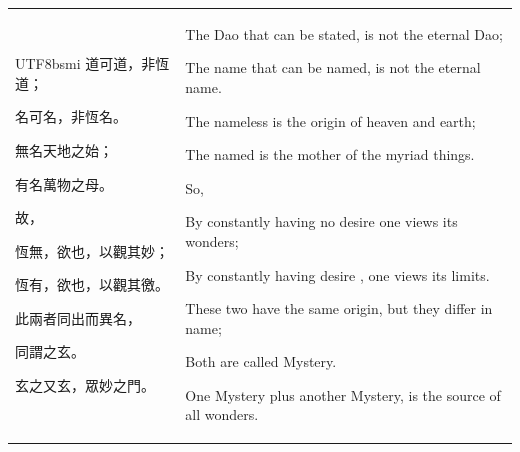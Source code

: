 \begin{table}[h]
\centering
\begin{tabular}{p{}p{}}

\begin{minipage}[t]{.35\textwidth}
\begin{CJK*}{UTF8}{bsmi}
道可道，非恆道；

名可名，非恆名。

無名天地之始；

有名萬物之母。

故，

恆無，欲也，以觀其妙；

恆有，欲也，以觀其徼。

此兩者同出而異名，

同謂之玄。

玄之又玄，眾妙之門。
\end{CJK*}
\end{minipage}
 &
\begin{minipage}[t]{.5\textwidth}
The Dao that can be stated, is not the eternal Dao;

The name that can be named, is not the eternal name.

The nameless is the origin of heaven and earth;

The named is the mother of the myriad things.

So,

By constantly having no desire one views its wonders;

By constantly having desire , one views its limits.

These two have the same origin, but they differ in name;

Both are called Mystery.

One Mystery plus another Mystery, is the source of all wonders.
\end{minipage}

\end{tabular}
\end{table}



